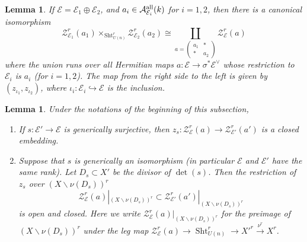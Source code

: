 \documentclass[reqno]{amsart}
\numberwithin{equation}{section}
\newcommand{\bs}{\backslash}
\DeclareMathOperator{\Sht}{Sht}
\newcommand{\incl}{\hookrightarrow}
\newcommand\mat[4]{\left(\begin{array}{cc} #1 & #2 \\ #3 & #4 \end{array}\right)}  %
\newcommand\xr{\xrightarrow}
\newcommand\op{\oplus}
\newcommand{\io}{\iota}
\newcommand{\s}{\sigma}
\newcommand\cA{\mathcal{A}}
\newcommand\cE{\mathcal{E}}
\newcommand\cZ{\mathcal{Z}}
\newtheorem{lemma}[thm]{Lemma}
\theoremstyle{remark}
\numberwithin{equation}{section}
\begin{document}
\begin{lemma}\label{l:KR direct sum}
If $\cE=\cE_{1}\op \cE_{2}$, and $a_{i}\in \cA^{\rm all}_{\cE_{i}}(k)$ for $i=1,2$, then there is a canonical isomorphism
\begin{equation}
\cZ^{r}_{\cE_{1}}(a_{1})\times_{\Sht^{r}_{U(n)}}\cZ^{r}_{\cE_{2}}(a_{2})\cong \coprod_{a=\mat{a_{1}}{*}{*}{a_{2}}}\cZ^{r}_{\cE}(a)
\end{equation}
where the union runs over all  Hermitian maps $a:\cE\to \s^{*}\cE^{\vee}$ whose restriction to $\cE_{i}$ is $a_{i}$ (for $i=1,2$). The map from the right side to the left is given by $(z_{\io_{1}},z_{\io_{2}})$, where $\io_{i}:\cE_{i}\incl \cE$ is the inclusion.
\end{lemma}


\begin{lemma}\label{l:change E} Under the  notations of the beginning of this subsection,
\begin{enumerate}
\item If $s:\cE'\to \cE$ is generically surjective, then $z_{s}:\cZ^{r}_{\cE}(a)\to \cZ^{r}_{\cE'}(a')$ is a closed embedding.
\item Suppose that $s$ is generically an isomorphism (in particular $\cE$ and $\cE'$ have the same rank). Let $D_{s}\subset X'$ be the divisor of $\det(s)$. Then the restriction of $z_{s}$ over $(X\bs \nu(D_{s}))^{r}$ 
\begin{equation}
\cZ^{r}_{\cE}(a)|_{(X\bs \nu(D_{s}))^{r}}\subset \cZ^{r}_{\cE'}(a')|_{(X\bs \nu(D_{s}))^{r}}
\end{equation}
is open and closed. Here we write $\cZ^{r}_{\cE}(a)|_{(X\bs \nu(D_{s}))^{r}}$ for the preimage of $(X\bs \nu(D_{s}))^{r}$ under the leg map $\cZ^{r}_{\cE}(a)\to \Sht^{r}_{U(n)}\to X'^{r}\xr{\nu^{r}} X^{r}$.
\end{enumerate}
\end{lemma}
\end{document}
